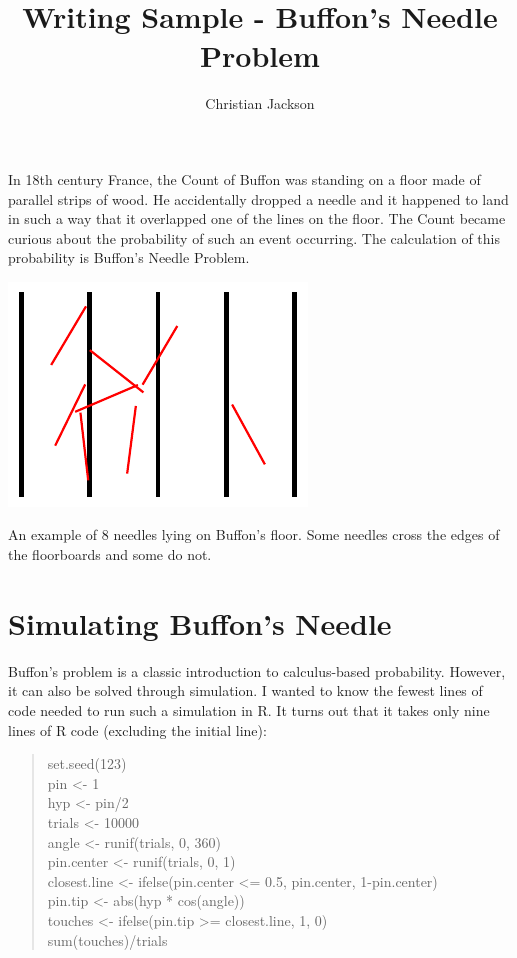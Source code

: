 \documentclass{tufte-handout}
\title{Writing Sample - Buffon's Needle Problem}
\author{Christian Jackson}
\date{}  %
\begin{document}
\maketitle%
\vspace{8px}
\noindent In 18th century France, the Count of Buffon was standing on a floor made of parallel strips of wood. He accidentally dropped a needle and it happened to land in such a way that it overlapped one of the lines on the floor. The Count became curious about the probability of such an event occurring. The calculation of this probability is Buffon's Needle Problem.
\begin{marginfigure}[-.1in]
\centering
\includegraphics{ex}
\caption{An example of 8 needles lying on Buffon's floor. Some needles cross the edges of the floorboards and some do not.}
\label{ex}
\end{marginfigure}

\section{Simulating Buffon's Needle}\label{sim}
Buffon's problem is a classic introduction to calculus-based probability. However, it can also be solved through simulation. I wanted to know the fewest lines of code needed to run such a simulation in R. It turns out that it takes only nine lines of R code (excluding the initial line):
\begin{quote}
  \ttfamily
  \footnotesize
set.seed(123)\\
pin <- 1\\
hyp <- pin/2\\
trials <- 10000\\
angle <- runif(trials, 0, 360)\\
pin.center <- runif(trials, 0, 1)\\
\quad closest.line <- ifelse(pin.center <= 0.5, pin.center, 1-pin.center)\\
\quad pin.tip <- abs(hyp * cos(angle))\\
\quad touches <- ifelse(pin.tip >= closest.line, 1, 0)\\
sum(touches)/trials
\end{quote}
\end{document}
